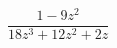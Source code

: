 \begin{ex}[type=expression]
	\begin{condition}
		\(\dfrac{1-9z^2}{18z^3+12z^2+2z}\)
	\end{condition}
\end{ex}